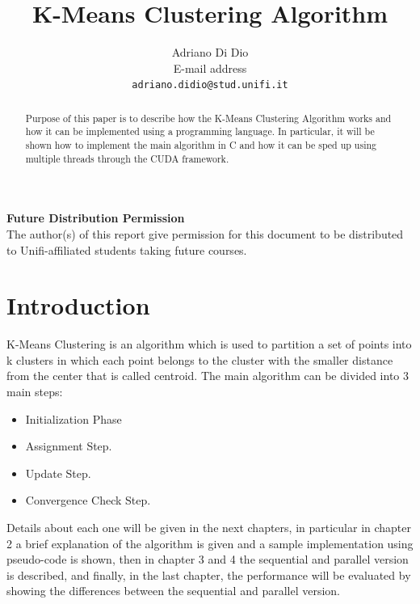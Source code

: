 \documentclass[10pt,twocolumn,letterpaper]{article}
\begin{document}
\title{K-Means Clustering Algorithm}

\author{Adriano Di Dio\\
E-mail address\\
{\tt\small adriano.didio@stud.unifi.it}
}

\maketitle
\thispagestyle{empty}

\begin{abstract}
Purpose of this paper is to describe how the K-Means Clustering Algorithm works and how it can be implemented using a 
programming language.\newline
In particular, it will be shown how to implement the main algorithm in C and how it can be sped up using multiple threads through the 
CUDA framework.
\end{abstract}

\noindent\large\textbf{Future Distribution Permission}\\
\indent The author(s) of this report give permission for this document to be distributed to Unifi-affiliated students taking future courses.

\section{Introduction}
K-Means Clustering is an algorithm which is used to partition a set of points into k clusters in which each point belongs to the cluster
with the smaller distance from the center that is called centroid.\newline
The main algorithm can be divided into 3 main steps:
\begin{itemize}
  \item Initialization Phase
  \item Assignment Step.
  \item Update Step.
  \item Convergence Check Step.
\end{itemize}
Details about each one will be given in the next chapters, in particular in chapter 2 a brief explanation of the algorithm is 
given and a sample implementation using pseudo-code is shown, then in chapter 3 and 4 the sequential and parallel version is described, 
and finally, in the last chapter, the performance will be evaluated by showing the differences between the sequential and parallel 
version.\newline
\end{document}
